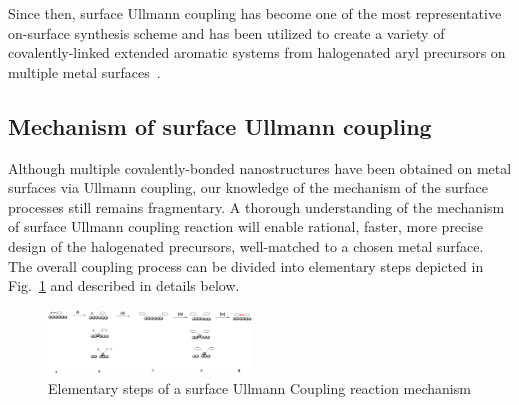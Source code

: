 \documentclass[%
 reprint,
 amsmath,amssymb,
 aps,
prb,
]{revtex4-2}
\begin{document}
Since then, surface Ullmann coupling has become one of the most representative on-surface synthesis scheme and has been utilized to create a variety of covalently-linked extended aromatic systems from halogenated aryl precursors on multiple metal surfaces~\cite{ullmann_33,ullmann_34, ullmann_42, ullmann_43, ullmann_45, ullmann_46, ullmann_47, ullmann_48}. 

\subsection{Mechanism of surface Ullmann coupling}

Although multiple covalently-bonded nanostructures have been obtained on metal surfaces via Ullmann coupling, our knowledge of the mechanism of the surface processes still remains fragmentary. 
%
A thorough understanding of the mechanism of surface Ullmann coupling reaction will enable rational, faster, more precise design of the halogenated precursors, well-matched to a chosen metal surface.
%
The overall coupling process can be divided into elementary steps depicted in Fig.~\ref{fig_mecha} and described in details below.
\begin{figure}[htb]
\centering
\includegraphics[width=0.48\textwidth]{Fig/mechanism.png}
\caption{Elementary steps of a surface Ullmann Coupling reaction mechanism}
\label{fig_mecha}
\end{figure}
\end{document}
